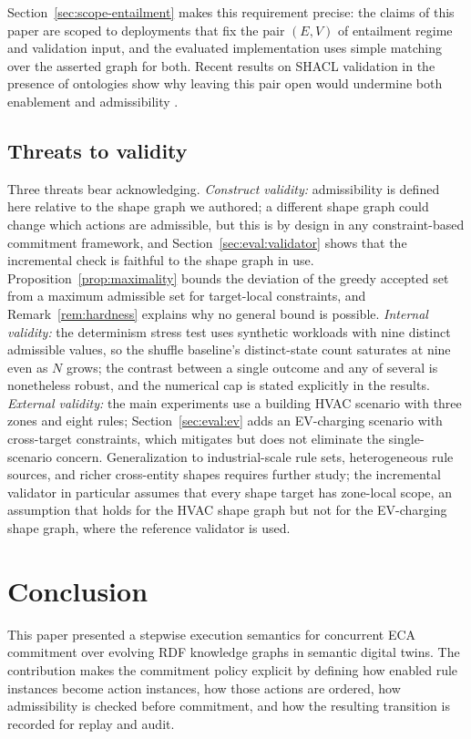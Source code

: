\documentclass{ieeeaccess}
\theoremstyle{definition}
\theoremstyle{plain}
\theoremstyle{remark}
\begin{document}
Section~\ref{sec:scope-entailment} makes this requirement precise: the claims of this paper are scoped to deployments that fix the pair $(E,V)$ of entailment regime and validation input, and the evaluated implementation uses simple matching over the asserted graph for both. Recent results on SHACL validation in the presence of ontologies show why leaving this pair open would undermine both enablement and admissibility \cite{Oudshoorn2026SHACLValidationOntologies}.


\subsection{Threats to validity}


Three threats bear acknowledging. \emph{Construct validity:} admissibility is defined here relative to the shape graph we authored; a different shape graph could change which actions are admissible, but this is by design in any constraint-based commitment framework, and Section~\ref{sec:eval:validator} shows that the incremental check is faithful to the shape graph in use. Proposition~\ref{prop:maximality} bounds the deviation of the greedy accepted set from a maximum admissible set for target-local constraints, and Remark~\ref{rem:hardness} explains why no general bound is possible. \emph{Internal validity:} the determinism stress test uses synthetic workloads with nine distinct admissible values, so the shuffle baseline's distinct-state count saturates at nine even as $N$ grows; the contrast between a single outcome and any of several is nonetheless robust, and the numerical cap is stated explicitly in the results. \emph{External validity:} the main experiments use a building HVAC scenario with three zones and eight rules; Section~\ref{sec:eval:ev} adds an EV-charging scenario with cross-target constraints, which mitigates but does not eliminate the single-scenario concern. Generalization to industrial-scale rule sets, heterogeneous rule sources, and richer cross-entity shapes requires further study; the incremental validator in particular assumes that every shape target has zone-local scope, an assumption that holds for the HVAC shape graph but not for the EV-charging shape graph, where the reference validator is used.


\section{Conclusion}

This paper presented a stepwise execution semantics for concurrent ECA commitment over evolving RDF knowledge graphs in semantic digital twins. The contribution makes the commitment policy explicit by defining how enabled rule instances become action instances, how those actions are ordered, how admissibility is checked before commitment, and how the resulting transition is recorded for replay and audit.
\end{document}
